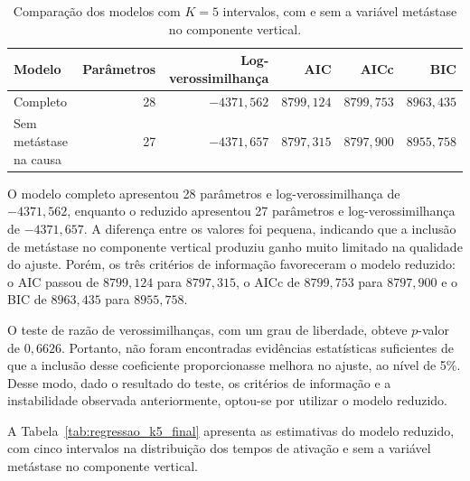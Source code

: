 \documentclass[11pt,a4paper]{article}
\begin{document}
\begin{table}[H]
\centering
\small
\setlength{\tabcolsep}{5pt}
\renewcommand{\arraystretch}{1.16}
\caption{Comparação dos modelos com $K=5$ intervalos, com e sem a variável metástase no componente vertical.}
\label{tab:comparacao_reduzido}
\begin{tabular}{@{}lrrrrr@{}}
\toprule
Modelo & Parâmetros & Log-verossimilhança & AIC & AICc & BIC \\
\midrule
Completo & 28 & $-4371{,}562$ & $8799{,}124$ & $8799{,}753$ & $8963{,}435$ \\
Sem metástase na causa & 27 & $-4371{,}657$ & $8797{,}315$ & $8797{,}900$ & $8955{,}758$ \\
\bottomrule
\end{tabular}
\end{table}

O modelo completo apresentou 28 parâmetros e log-verossimilhança de $-4371{,}562$, enquanto o reduzido apresentou 27 parâmetros e log-verossimilhança de $-4371{,}657$. A diferença entre os valores foi pequena, indicando que a inclusão de metástase no componente vertical produziu ganho muito limitado na qualidade do ajuste. Porém, os três critérios de informação favoreceram o modelo reduzido: o AIC passou de $8799{,}124$ para $8797{,}315$, o AICc de $8799{,}753$ para $8797{,}900$ e o BIC de $8963{,}435$ para $8955{,}758$.

O teste de razão de verossimilhanças, com um grau de liberdade, obteve $p$-valor de $0{,}6626$. Portanto, não foram encontradas evidências estatísticas suficientes de que a inclusão desse coeficiente proporcionasse melhora no ajuste, ao nível de 5\%. Desse modo, dado o resultado do teste, os critérios de informação e a instabilidade observada anteriormente, optou-se por utilizar o modelo reduzido. 

A Tabela~\ref{tab:regressao_k5_final} apresenta as estimativas do modelo reduzido, com cinco intervalos na distribuição dos tempos de ativação e sem a variável metástase no componente vertical. 
\end{document}
